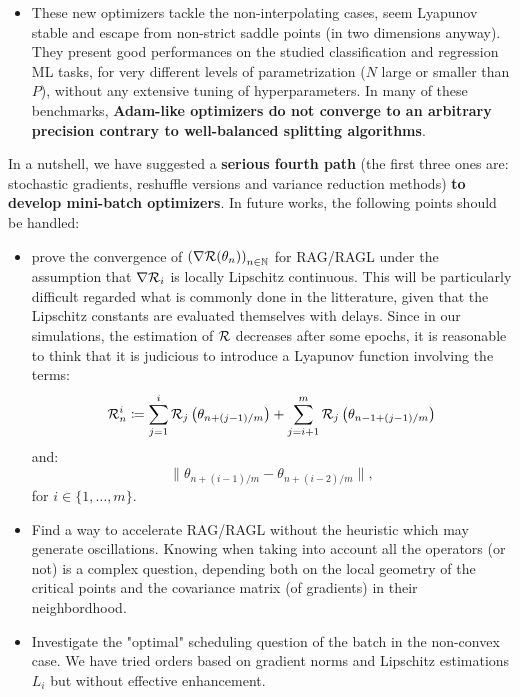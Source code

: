 \begin{itemize}
	\item These new optimizers tackle the non-interpolating cases, seem Lyapunov stable and escape from non-strict saddle points (in two dimensions anyway). They present good performances on the studied classification and regression ML tasks, for very different levels of parametrization ($N$ large or smaller than $P$), without any extensive tuning of hyperparameters. In many of these benchmarks, \textbf{Adam-like optimizers do not converge to an arbitrary precision contrary to well-balanced splitting algorithms}. 
\end{itemize} 
In a nutshell, we have suggested a \textbf{serious fourth path} (the first three ones are: stochastic gradients, reshuffle versions and variance reduction methods) \textbf{to develop mini-batch optimizers}. In future works, the following points should be handled:
\begin{itemize}
	\item prove the convergence of $\left(\nabla \mathcal{R}(\theta_n)\right)_{n\in \mathbb{N}}$ for RAG/RAGL under the assumption that $\nabla \mathcal{R}_i$ is locally Lipschitz continuous. This will be particularly difficult regarded what is commonly done in the litterature, given that the Lipschitz constants are evaluated themselves with delays. Since in our simulations, the estimation of $\mathcal{R}$ decreases after some epochs, it is reasonable to think that it is judicious to introduce a Lyapunov function \cite{Bilel_ICML,polyak_momentum_stability,Lyapunov_Nesterov,variational_perspective} involving the terms:
	\begin{equation*}
		\mathcal{R}_n^i \coloneqq \sum_{j=1}^i \mathcal{R}_j\left(\theta_{n+(j-1)/m}\right)+\sum_{j=i+1}^m \mathcal{R}_j\left(\theta_{n-1+(j-1)/m}\right)
	\end{equation*}
	and:
	\begin{equation*}
		\|\theta_{n+(i-1)/m}-\theta_{n+(i-2)/m}\|,
	\end{equation*}
	for $i\in \{1,\dots,m\}$.
	\item Find a way to accelerate RAG/RAGL without the heuristic which may generate oscillations. Knowing when taking into account all the operators (or not) is a complex question, depending both on the local geometry of the critical points and the covariance matrix (of gradients) in their neighbordhood. 
	\item Investigate the "optimal" scheduling question of the batch in the non-convex case. We have tried orders based on gradient norms and Lipschitz estimations $L_i$ but without effective enhancement.   
\end{itemize}  

